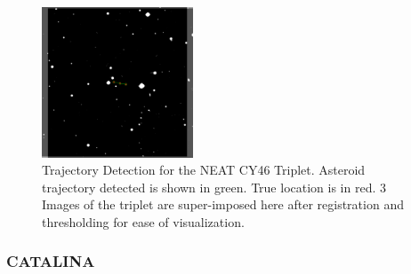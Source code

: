 

\begin{figure}[h]
\begin{center}
\includegraphics[width=0.4\textwidth]{Figures/NEATLines_LogicalImg.pdf}
\end{center}
\caption{Trajectory Detection for the NEAT CY46 Triplet. Asteroid trajectory detected is shown in green. True location is in red. 3 Images of the triplet are super-imposed here after registration and thresholding for ease of visualization.}
\label{fig:IPP_NEAT_Trajectory}
\end{figure}
\subsubsection{CATALINA}


